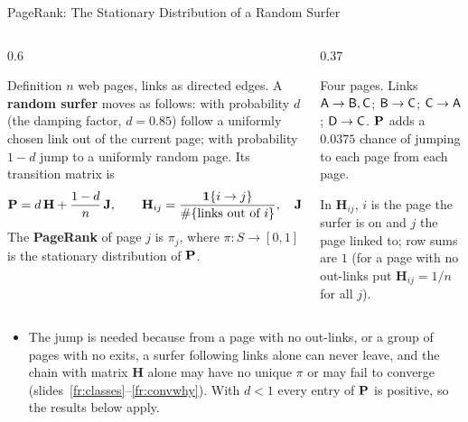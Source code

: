 \begin{frame}{PageRank: The Stationary Distribution of a Random Surfer}
  \label{fr:pagerank}
  \small
  \begin{columns}[T]
    \begin{column}{0.6\textwidth}
      \begin{block}{Definition}
        $n$ web pages, links as directed edges. A \textbf{random surfer} moves as follows: with probability $d$ (the damping factor, $d=0.85$) follow a uniformly chosen link out of the current page; with probability $1-d$ jump to a uniformly random page. Its transition matrix is
        \[
          \mathbf{P}=d\,\mathbf H+\frac{1-d}{n}\,\mathbf J,\qquad \mathbf H_{ij}=\frac{\mathbf{1}\{i\to j\}}{\#\{\text{links out of } i\}},\quad \mathbf J_{ij}=1 .
        \]
        The \textbf{PageRank} of page $j$ is $\pi_j$, where $\pi\colon S\to[0,1]$ is the stationary distribution of $\mathbf{P}$.
      \end{block}
    \end{column}
    \begin{column}{0.37\textwidth}
      \centering
      \par\medskip
      {\footnotesize Four pages. Links $\mathsf{A}\to\mathsf{B},\mathsf{C}$; $\mathsf{B}\to\mathsf{C}$; $\mathsf{C}\to\mathsf{A}$; $\mathsf{D}\to\mathsf{C}$. $\mathbf{P}$ adds a $0.0375$ chance of jumping to each page from each page.}
      \par\medskip
      {\footnotesize In $\mathbf H_{ij}$, $i$ is the page the surfer is on and $j$ the page linked to; row sums are $1$ (for a page with no out-links put $\mathbf H_{ij}=1/n$ for all $j$).}
    \end{column}
  \end{columns}
  \begin{itemize}
    \item The jump is needed because from a page with no out-links, or a group of pages with no exits, a surfer following links alone can never leave, and the chain with matrix $\mathbf H$ alone may have no unique $\pi$ or may fail to converge (slides~\ref{fr:classes}--\ref{fr:convwhy}). With $d<1$ every entry of $\mathbf{P}$ is positive, so the results below apply.
  \end{itemize}
\end{frame}

